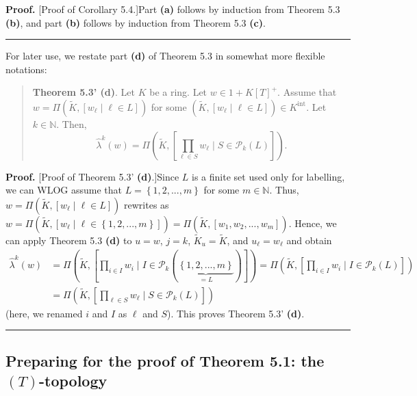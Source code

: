 \documentclass[numbers=enddot,12pt,final,onecolumn,notitlepage]{scrartcl}%
\newenvironment{proof}[1][Proof]{\noindent\textbf{#1.} }{\ \rule{0.5em}{0.5em}}
\begin{document}
\begin{proof}
[Proof of Corollary 5.4.]Part \textbf{(a)} follows by induction from Theorem
5.3 \textbf{(b)}, and part \textbf{(b)} follows by induction from Theorem 5.3
\textbf{(c)}.
\end{proof}

For later use, we restate part \textbf{(d)} of Theorem 5.3 in somewhat more
flexible notations:

\begin{quote}
\textbf{Theorem 5.3' (d)}. Let $K$ be a ring. Let $w\in1+K\left[  T\right]
^{+}$. Assume that $w=\Pi\left(  \widetilde{K},\left[  w_{\ell}\mid\ell\in
L\right]  \right)  $ for some $\left(  \widetilde{K},\left[  w_{\ell}\mid
\ell\in L\right]  \right)  \in K^{\operatorname*{int}}$. Let $k\in\mathbb{N}$.
Then,%
\[
\widehat{\lambda}^{k}\left(  w\right)  =\Pi\left(  \widetilde{K},\left[
\prod_{\ell\in S}w_{\ell}\mid S\in\mathcal{P}_{k}\left(  L\right)  \right]
\right)  .
\]



\end{quote}

\begin{proof}
[Proof of Theorem 5.3' \textbf{(d)}.]Since $L$ is a finite set used only for
labelling, we can WLOG assume that $L=\left\{  1,2,...,m\right\}  $ for some
$m\in\mathbb{N}$. Thus, $w=\Pi\left(  \widetilde{K},\left[  w_{\ell}\mid
\ell\in L\right]  \right)  $ rewrites as $w=\Pi\left(  \widetilde{K},\left[
w_{\ell}\mid\ell\in\left\{  1,2,...,m\right\}  \right]  \right)  =\Pi\left(
\widetilde{K},\left[  w_{1},w_{2},...,w_{m}\right]  \right)  $. Hence, we can
apply Theorem 5.3 \textbf{(d)} to $u=w$, $j=k$, $\widetilde{K}_{u}%
=\widetilde{K}$, and $u_{\ell}=w_{\ell}$ and obtain%
\begin{align*}
\widehat{\lambda}^{k}\left(  w\right)   &  =\Pi\left(  \widetilde{K},\left[
\prod_{i\in I}w_{i}\mid I\in\mathcal{P}_{k}\left(  \underbrace{\left\{
1,2,...,m\right\}  }_{=L}\right)  \right]  \right)  =\Pi\left(  \widetilde{K}%
,\left[  \prod_{i\in I}w_{i}\mid I\in\mathcal{P}_{k}\left(  L\right)  \right]
\right) \\
&  =\Pi\left(  \widetilde{K},\left[  \prod_{\ell\in S}w_{\ell}\mid
S\in\mathcal{P}_{k}\left(  L\right)  \right]  \right)
\end{align*}
(here, we renamed $i$ and $I$ as $\ell$ and $S$). This proves Theorem 5.3'
\textbf{(d)}.
\end{proof}

\subsection{Preparing for the proof of Theorem 5.1: the $\left(  T\right)
$-topology}
\end{document}
